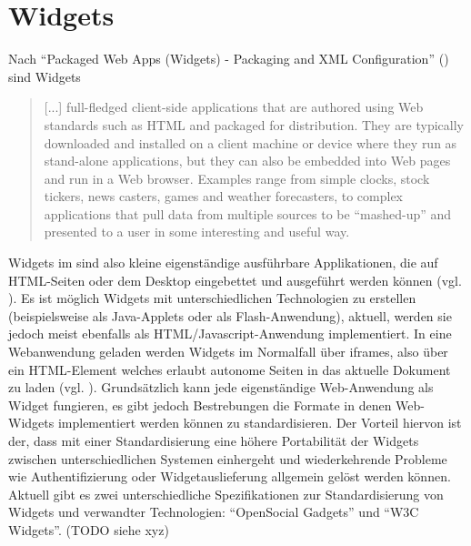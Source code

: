 \section{Widgets}\label{section:widgets}
Nach "`Packaged Web Apps (Widgets) - Packaging and XML Configuration"' (\cite{W3C-11-2012}) sind Widgets
\begin{quotation}[...] full-fledged client-side applications that are authored using Web standards such as HTML and packaged for distribution. They are typically downloaded and installed on a client machine or device where they run as stand-alone applications, but they can also be embedded into Web pages and run in a Web browser. Examples range from simple clocks, stock tickers, news casters, games and weather forecasters, to complex applications that pull data from multiple sources to be "`mashed-up"' and presented to a user in some interesting and useful way.\end{quotation}
Widgets im sind also kleine eigenständige ausführbare Applikationen, die auf HTML-Seiten oder dem Desktop eingebettet und ausgeführt werden können (vgl. \cite{Taraghi2010}). Es ist möglich Widgets mit unterschiedlichen Technologien zu erstellen (beispielsweise als Java-Applets oder als Flash-Anwendung), aktuell, werden sie jedoch meist ebenfalls als HTML/Javascript-Anwendung implementiert. In eine Webanwendung geladen werden Widgets im Normalfall über iframes, also über ein HTML-Element welches erlaubt autonome Seiten in das aktuelle Dokument zu laden (vgl. \cite{W3C1999}). Grundsätzlich kann jede eigenständige Web-Anwendung als Widget fungieren, es gibt jedoch Bestrebungen die Formate in denen Web-Widgets implementiert werden können zu standardisieren. Der Vorteil hiervon ist der, dass mit einer Standardisierung eine höhere Portabilität der Widgets zwischen unterschiedlichen Systemen einhergeht und wiederkehrende Probleme wie Authentifizierung oder Widgetauslieferung allgemein gelöst werden können. Aktuell gibt es zwei unterschiedliche Spezifikationen zur Standardisierung von Widgets und verwandter Technologien: "`OpenSocial Gadgets"' und "`W3C Widgets"'. (TODO siehe xyz)